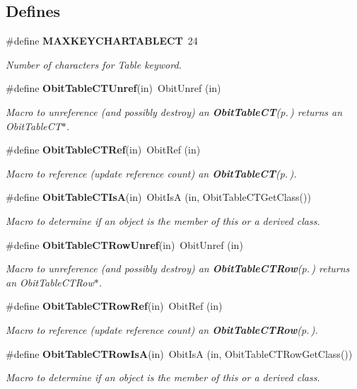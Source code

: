 \subsection*{Defines}
\begin{CompactItemize}
\item 
\#define {\bf MAXKEYCHARTABLECT}\ 24
\begin{CompactList}\small\item\em Number of characters for Table keyword. \item\end{CompactList}\item 
\#define {\bf Obit\-Table\-CTUnref}(in)\ Obit\-Unref (in)
\begin{CompactList}\small\item\em Macro to unreference (and possibly destroy) an {\bf Obit\-Table\-CT}{\rm (p.\,\pageref{structObitTableCT})} returns an Obit\-Table\-CT$\ast$. \item\end{CompactList}\item 
\#define {\bf Obit\-Table\-CTRef}(in)\ Obit\-Ref (in)
\begin{CompactList}\small\item\em Macro to reference (update reference count) an {\bf Obit\-Table\-CT}{\rm (p.\,\pageref{structObitTableCT})}. \item\end{CompactList}\item 
\#define {\bf Obit\-Table\-CTIs\-A}(in)\ Obit\-Is\-A (in, Obit\-Table\-CTGet\-Class())
\begin{CompactList}\small\item\em Macro to determine if an object is the member of this or a derived class. \item\end{CompactList}\item 
\#define {\bf Obit\-Table\-CTRow\-Unref}(in)\ Obit\-Unref (in)
\begin{CompactList}\small\item\em Macro to unreference (and possibly destroy) an {\bf Obit\-Table\-CTRow}{\rm (p.\,\pageref{structObitTableCTRow})} returns an Obit\-Table\-CTRow$\ast$. \item\end{CompactList}\item 
\#define {\bf Obit\-Table\-CTRow\-Ref}(in)\ Obit\-Ref (in)
\begin{CompactList}\small\item\em Macro to reference (update reference count) an {\bf Obit\-Table\-CTRow}{\rm (p.\,\pageref{structObitTableCTRow})}. \item\end{CompactList}\item 
\#define {\bf Obit\-Table\-CTRow\-Is\-A}(in)\ Obit\-Is\-A (in, Obit\-Table\-CTRow\-Get\-Class())
\begin{CompactList}\small\item\em Macro to determine if an object is the member of this or a derived class. \item\end{CompactList}\end{CompactItemize}
